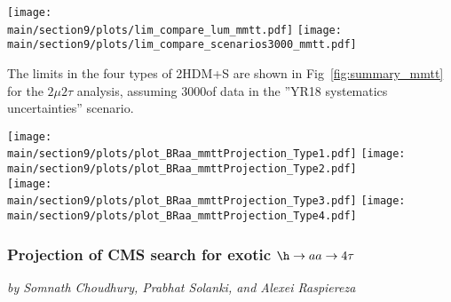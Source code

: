 \begin{figure*}[hbpt]
\centering
        \texttt{[image: \\main/section9/plots/lim\_compare\_lum\_mmtt.pdf]}
        \texttt{[image: \\main/section9/plots/lim\_compare\_scenarios3000\_mmtt.pdf]}\\
    \caption{Left: Projected expected limits on $(\sigma(h)/\sigma_{\textrm{SM}}) \mathcal{B}(h \to aa \to 2\mu 2\tau)$, for 36, 300, and 3000 fb$^{-1}$. Right: Projected expected limits on $(\sigma(h)/\sigma_{\textrm{SM}}) \mathcal{B}(h\to aa \to 2\mu2\tau)$, comparing different scenarios for systematic uncertainties for an integrated luminosity of 3000\fbinv.}
    \label{fig:mmtt_proj}
\end{figure*}

The limits in the four types of 2HDM+S are shown
in Fig~\ref{fig:summary_mmtt} for the $2\mu 2\tau$ analysis, assuming 3000\fbinv of data in the ''YR18 systematics uncertainties'' scenario.

\begin{figure*}[hbpt]
\centering
        \texttt{[image: \\main/section9/plots/plot\_BRaa\_mmttProjection\_Type1.pdf]}
        \texttt{[image: \\main/section9/plots/plot\_BRaa\_mmttProjection\_Type2.pdf]} \\
        \texttt{[image: \\main/section9/plots/plot\_BRaa\_mmttProjection\_Type3.pdf]}
        \texttt{[image: \\main/section9/plots/plot\_BRaa\_mmttProjection\_Type4.pdf]}
    \caption{Expected upper limits on $(\sigma(h)/\sigma_{\textrm{SM}})\mathcal{B}(h\to aa)$ for 3000\fbinv of data with YR18 systematic uncertainties for the $2\mu 2\tau$ final state in 2HDM+S type-1 (top left), type-2 (top right), type-3 (bottom left), and type-4 (bottom right).}
    \label{fig:summary_mmtt}
\end{figure*}


\subsubsection{Projection of CMS search for exotic $\h\to aa \to 4\tau$}
\begin{center}
 {\it{ by Somnath Choudhury, Prabhat Solanki, and Alexei Raspiereza}}
\end{center}

